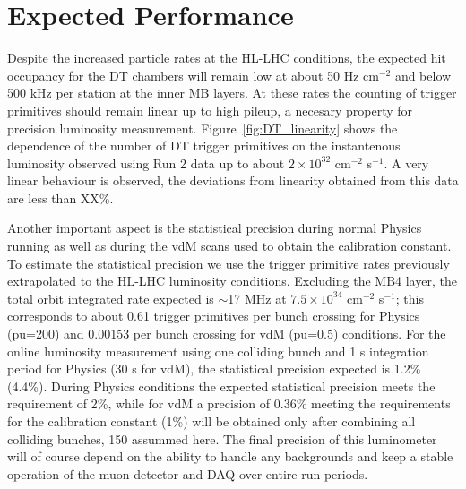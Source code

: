 \section{Expected Performance}

Despite the increased particle rates at the HL-LHC conditions, the expected hit occupancy for the DT chambers will remain low at about 50 Hz cm$^{-2}$
and below 500 kHz per station at the inner MB layers.
At these rates the counting of trigger primitives should remain linear up to high pileup, a necesary property for precision luminosity measurement.
Figure~\ref{fig:DT_linearity} shows the dependence of the number of DT trigger primitives on the instantenous luminosity
observed using Run 2 data up to about $2\times10^{32}$ cm$^{-2}$ s$^{-1}$.
A very linear behaviour is observed, the deviations from linearity obtained from this data are less than XX\%.

Another important aspect is the statistical precision during normal Physics running as well as during the vdM scans used to obtain the calibration constant.
To estimate the statistical precision we use the trigger primitive rates previously extrapolated to the HL-LHC luminosity conditions.
Excluding the MB4 layer, the total orbit integrated rate expected is $\sim$17 MHz at $7.5\times10^{34}$ cm$^{-2}$ s$^{-1}$;
this corresponds to about 0.61 trigger primitives per bunch crossing for Physics (pu=200) and 0.00153 per bunch crossing for vdM (pu=0.5) conditions.    
For the online luminosity measurement using one colliding bunch and 1 s integration period for Physics (30 s for vdM),
the statistical precision expected is 1.2\% (4.4\%).
During Physics conditions the expected statistical precision meets the requirement of 2\%,
while for vdM a precision of 0.36\%  meeting the requirements for the calibration constant (1\%) will be obtained only after combining all colliding bunches, 150 assummed here.
The final precision of this luminometer will of course depend on the ability to handle any backgrounds and keep a stable operation of the muon detector and DAQ over entire run periods.


\clearpage


